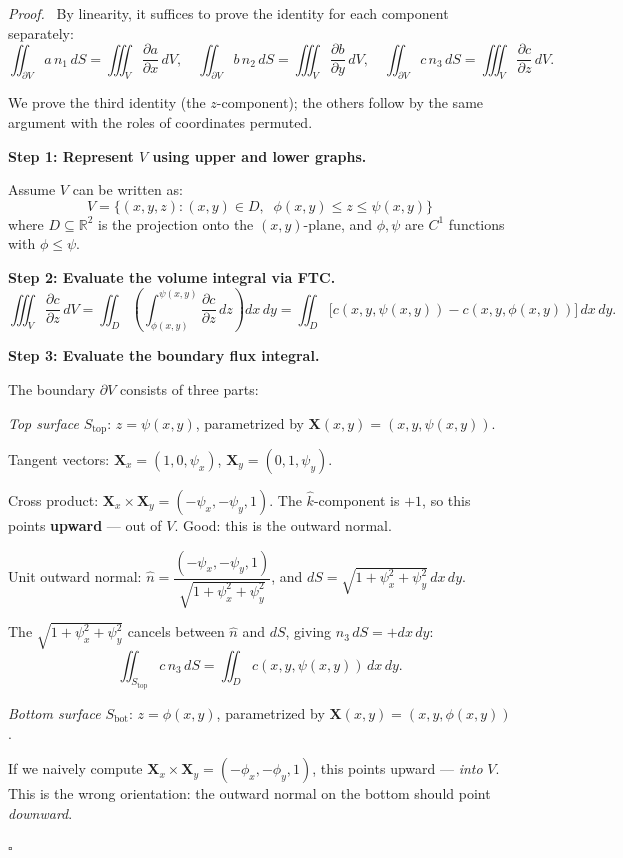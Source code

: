\documentclass[11pt]{report}
\renewenvironment{proof}[1][Proof]{\par\noindent\textit{#1.}\ }{\hfill$\square$\par\medskip}
\newcommand{\R}{\mathbb{R}}
\newcommand{\parti}[2]{\frac{\partial #1}{\partial #2}}
\begin{document}
\begin{proof}
By linearity, it suffices to prove the identity for each component separately:
\[
\iint_{\partial V} a \, n_1 \, dS = \iiint_V \parti{a}{x} \, dV, \quad \iint_{\partial V} b \, n_2 \, dS = \iiint_V \parti{b}{y} \, dV, \quad \iint_{\partial V} c \, n_3 \, dS = \iiint_V \parti{c}{z} \, dV.
\]

We prove the third identity (the $z$-component); the others follow by the same argument with the roles of coordinates permuted.

\textbf{Step 1: Represent $V$ using upper and lower graphs.}

Assume $V$ can be written as:
\[
V = \{(x,y,z) : (x,y) \in D, \;\; \phi(x,y) \leq z \leq \psi(x,y)\}
\]
where $D \subseteq \R^2$ is the projection onto the $(x,y)$-plane, and $\phi, \psi$ are $C^1$ functions with $\phi \leq \psi$.

\textbf{Step 2: Evaluate the volume integral via FTC.}
\[
\iiint_V \parti{c}{z} \, dV = \iint_D \left( \int_{\phi(x,y)}^{\psi(x,y)} \parti{c}{z} \, dz \right) dx \, dy = \iint_D \big[ c(x, y, \psi(x,y)) - c(x, y, \phi(x,y)) \big] \, dx \, dy.
\]

\textbf{Step 3: Evaluate the boundary flux integral.}

The boundary $\partial V$ consists of three parts:

\textit{Top surface} $S_{\text{top}}$: $z = \psi(x,y)$, parametrized by $\mathbf{X}(x,y) = (x, y, \psi(x,y))$.

Tangent vectors: $\mathbf{X}_x = (1, 0, \psi_x)$, $\mathbf{X}_y = (0, 1, \psi_y)$.

Cross product: $\mathbf{X}_x \times \mathbf{X}_y = (-\psi_x, -\psi_y, 1)$. The $\hat{k}$-component is $+1$, so this points \textbf{upward} --- out of $V$. Good: this is the outward normal.

Unit outward normal: $\hat{n} = \dfrac{(-\psi_x, -\psi_y, 1)}{\sqrt{1 + \psi_x^2 + \psi_y^2}}$, and $dS = \sqrt{1 + \psi_x^2 + \psi_y^2} \, dx \, dy$.

The $\sqrt{1 + \psi_x^2 + \psi_y^2}$ cancels between $\hat{n}$ and $dS$, giving $n_3 \, dS = +dx \, dy$:
\[
\iint_{S_{\text{top}}} c \, n_3 \, dS = \iint_D c(x, y, \psi(x,y)) \, dx \, dy.
\]

\textit{Bottom surface} $S_{\text{bot}}$: $z = \phi(x,y)$, parametrized by $\mathbf{X}(x,y) = (x, y, \phi(x,y))$.

If we naively compute $\mathbf{X}_x \times \mathbf{X}_y = (-\phi_x, -\phi_y, 1)$, this points upward --- \textit{into} $V$. This is the wrong orientation: the outward normal on the bottom should point \textit{downward}.


\end{proof}
\end{document}

